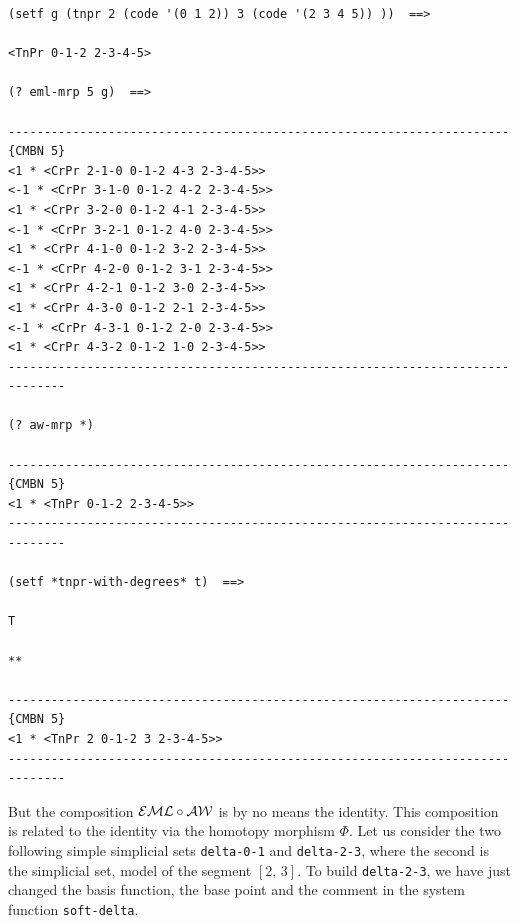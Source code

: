 {\footnotesize\begin{verbatim}
(setf g (tnpr 2 (code '(0 1 2)) 3 (code '(2 3 4 5)) ))  ==>

<TnPr 0-1-2 2-3-4-5>

(? eml-mrp 5 g)  ==>

----------------------------------------------------------------------{CMBN 5}
<1 * <CrPr 2-1-0 0-1-2 4-3 2-3-4-5>>
<-1 * <CrPr 3-1-0 0-1-2 4-2 2-3-4-5>>
<1 * <CrPr 3-2-0 0-1-2 4-1 2-3-4-5>>
<-1 * <CrPr 3-2-1 0-1-2 4-0 2-3-4-5>>
<1 * <CrPr 4-1-0 0-1-2 3-2 2-3-4-5>>
<-1 * <CrPr 4-2-0 0-1-2 3-1 2-3-4-5>>
<1 * <CrPr 4-2-1 0-1-2 3-0 2-3-4-5>>
<1 * <CrPr 4-3-0 0-1-2 2-1 2-3-4-5>>
<-1 * <CrPr 4-3-1 0-1-2 2-0 2-3-4-5>>
<1 * <CrPr 4-3-2 0-1-2 1-0 2-3-4-5>>
------------------------------------------------------------------------------

(? aw-mrp *)

----------------------------------------------------------------------{CMBN 5}
<1 * <TnPr 0-1-2 2-3-4-5>>
------------------------------------------------------------------------------

(setf *tnpr-with-degrees* t)  ==>

T

**

----------------------------------------------------------------------{CMBN 5}
<1 * <TnPr 2 0-1-2 3 2-3-4-5>>
------------------------------------------------------------------------------
\end{verbatim}}
But the composition ${\cal EML} \circ {\cal AW}$ is by no means the identity. This composition
is related to the identity via the homotopy morphism $\Phi$. Let us consider the
two following simple simplicial sets {\tt delta-0-1} and {\tt delta-2-3}, where the
second is the simplicial set, model of the segment $[2,\,3]$. To build {\tt delta-2-3}, we
have just changed the basis function, the base point and the comment in the system function {\tt soft-delta}.
